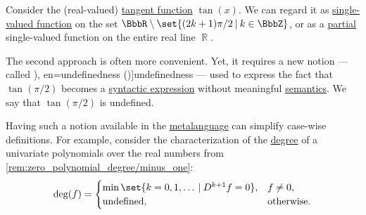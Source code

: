 \begin{concept}\label{con:undefinedness}\mimprovised
  Consider the (real-valued) \hyperref[def:derived_trigonometric_functions/tan]{tangent function} \( \tan(x) \). We can regard it as \hyperref[def:function]{single-valued function} on the set \( \BbbR \setminus \set{ (2k + 1) \pi / 2 \given k \in \BbbZ } \), or as a \hyperref[def:set_valued_map/partial]{partial} single-valued function on the entire real line \( \BbbR \).

  The second approach is often more convenient. Yet, it requires a new notion --- called \term[ru=неопределённость (\cite[62]{ШеньВерещагин2020НачалаТеорииМножеств}), en=undefinedness (\cite[284]{Farmer2008STTVirtues})]{undefinedness} --- used to express the fact that \( \tan(\pi / 2) \) becomes a \hyperref[con:expression]{syntactic expression} without meaningful \hyperref[con:syntax_semantics_duality]{semantics}. We say that \( \tan(\pi / 2) \) is undefined.

  Having such a notion available in the \hyperref[con:metalogic]{metalanguage} can simplify case-wise definitions. For example, consider the characterization of the \hyperref[def:polynomial_degree]{degree} of a univariate polynomials over the real numbers from \cref{rem:zero_polynomial_degree/minus_one}:
  \begin{equation*}
    \deg(f) = \begin{cases}
      \min\set{ k = 0, 1, \ldots \given D^{k+1} f = 0 }, &f \neq 0, \\
      \T{undefined},                                     &\T{otherwise.}
    \end{cases}
  \end{equation*}
\end{concept}
